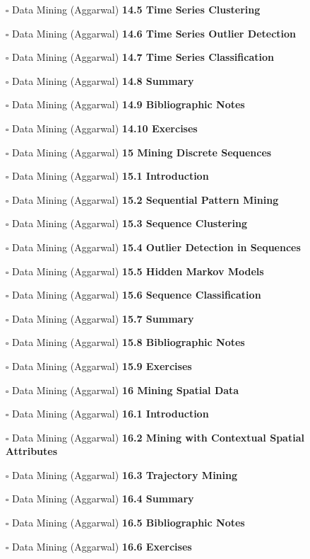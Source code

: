 \documentclass[a4, landscape, 12pt]{article}
\newcommand{\checkbox}{$\square$}%
\begin{document}
\begin{itemize}
{}
\item [\checkbox]  Data Mining (Aggarwal) \textbf{ 14.5 Time Series Clustering
}
\item [\checkbox]  Data Mining (Aggarwal) \textbf{ 14.6 Time Series Outlier Detection
}
\item [\checkbox]  Data Mining (Aggarwal) \textbf{ 14.7 Time Series Classification
}
\item [\checkbox]  Data Mining (Aggarwal) \textbf{ 14.8 Summary
}
\item [\checkbox]  Data Mining (Aggarwal) \textbf{ 14.9 Bibliographic Notes
}
\item [\checkbox]  Data Mining (Aggarwal) \textbf{ 14.10 Exercises
}
\item [\checkbox]  Data Mining (Aggarwal) \textbf{ 15 Mining Discrete Sequences
}
\item [\checkbox]  Data Mining (Aggarwal) \textbf{ 15.1 Introduction
}
\item [\checkbox]  Data Mining (Aggarwal) \textbf{ 15.2 Sequential Pattern Mining
}
\item [\checkbox]  Data Mining (Aggarwal) \textbf{ 15.3 Sequence Clustering
}
\item [\checkbox]  Data Mining (Aggarwal) \textbf{ 15.4 Outlier Detection in Sequences
}
\item [\checkbox]  Data Mining (Aggarwal) \textbf{ 15.5 Hidden Markov Models
}
\item [\checkbox]  Data Mining (Aggarwal) \textbf{ 15.6 Sequence Classification
}
\item [\checkbox]  Data Mining (Aggarwal) \textbf{ 15.7 Summary
}
\item [\checkbox]  Data Mining (Aggarwal) \textbf{ 15.8 Bibliographic Notes
}
\item [\checkbox]  Data Mining (Aggarwal) \textbf{ 15.9 Exercises
}
\item [\checkbox]  Data Mining (Aggarwal) \textbf{ 16 Mining Spatial Data
}
\item [\checkbox]  Data Mining (Aggarwal) \textbf{ 16.1 Introduction
}
\item [\checkbox]  Data Mining (Aggarwal) \textbf{ 16.2 Mining with Contextual Spatial Attributes
}
\item [\checkbox]  Data Mining (Aggarwal) \textbf{ 16.3 Trajectory Mining
}
\item [\checkbox]  Data Mining (Aggarwal) \textbf{ 16.4 Summary
}
\item [\checkbox]  Data Mining (Aggarwal) \textbf{ 16.5 Bibliographic Notes
}
\item [\checkbox]  Data Mining (Aggarwal) \textbf{ 16.6 Exercises
}
\end{itemize}
\end{document}
